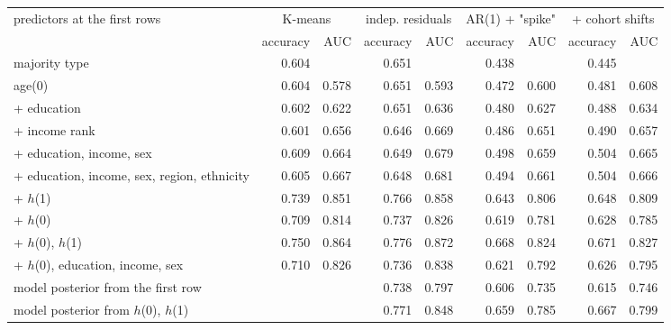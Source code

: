 \begin{tabular}{lrrrrrrrr}
\toprule
predictors at the first rows & \multicolumn{2}{c}{K-means} & \multicolumn{2}{c}{indep. residuals} & \multicolumn{2}{c}{AR(1) + "spike"} & \multicolumn{2}{c}{+ cohort shifts} \\
\cmidrule(lr){2-3} \cmidrule(lr){4-5} \cmidrule(lr){6-7} \cmidrule(lr){8-9}
 & accuracy & AUC & accuracy & AUC & accuracy & AUC & accuracy & AUC \\
\midrule
majority type & 0.604 &  & 0.651 &  & 0.438 &  & 0.445 &  \\
age(0) & 0.604 & 0.578 & 0.651 & 0.593 & 0.472 & 0.600 & 0.481 & 0.608 \\
+ education & 0.602 & 0.622 & 0.651 & 0.636 & 0.480 & 0.627 & 0.488 & 0.634 \\
+ income rank & 0.601 & 0.656 & 0.646 & 0.669 & 0.486 & 0.651 & 0.490 & 0.657 \\
+ education, income, sex & 0.609 & 0.664 & 0.649 & 0.679 & 0.498 & 0.659 & 0.504 & 0.665 \\
+ education, income, sex, region, ethnicity & 0.605 & 0.667 & 0.648 & 0.681 & 0.494 & 0.661 & 0.504 & 0.666 \\
+ $h$(1) & 0.739 & 0.851 & 0.766 & 0.858 & 0.643 & 0.806 & 0.648 & 0.809 \\
+ $h$(0) & 0.709 & 0.814 & 0.737 & 0.826 & 0.619 & 0.781 & 0.628 & 0.785 \\
+ $h$(0), $h$(1) & 0.750 & 0.864 & 0.776 & 0.872 & 0.668 & 0.824 & 0.671 & 0.827 \\
+ $h$(0), education, income, sex & 0.710 & 0.826 & 0.736 & 0.838 & 0.621 & 0.792 & 0.626 & 0.795 \\
model posterior from the first row &  &  & 0.738 & 0.797 & 0.606 & 0.735 & 0.615 & 0.746 \\
model posterior from $h$(0), $h$(1) &  &  & 0.771 & 0.848 & 0.659 & 0.785 & 0.667 & 0.799 \\
\bottomrule
\end{tabular}
